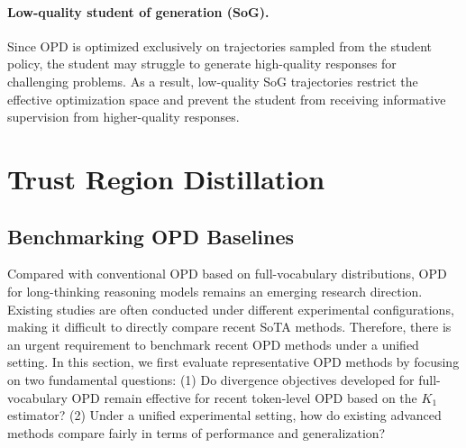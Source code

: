 \documentclass{article} %
\begin{document}
\paragraph{Low-quality student of generation (SoG).}
Since OPD is optimized exclusively on trajectories sampled from the student policy, the student may struggle to generate high-quality responses for challenging problems. As a result, low-quality SoG trajectories restrict the effective optimization space and prevent the student from receiving informative supervision from higher-quality responses.


\section{Trust Region Distillation}

\subsection{Benchmarking OPD Baselines}

Compared with conventional OPD based on full-vocabulary distributions, OPD for long-thinking reasoning models remains an emerging research direction. Existing studies are often conducted under different experimental configurations, making it difficult to directly compare recent SoTA methods. Therefore, there is an urgent requirement to benchmark recent OPD methods under a unified setting. In this section, we first evaluate representative OPD methods by focusing on two fundamental questions: 
(1) Do divergence objectives developed for full-vocabulary OPD remain effective for recent token-level OPD based on the $K_1$ estimator? 
(2) Under a unified experimental setting, how do existing advanced methods compare fairly in terms of performance and generalization?
\end{document}
